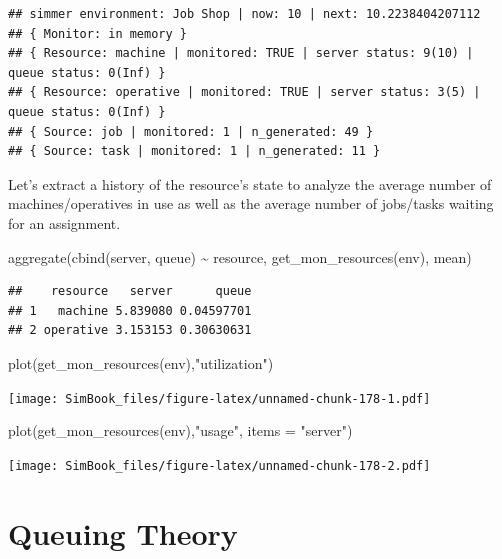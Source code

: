 \documentclass[
]{book}
\newenvironment{Shaded}{\begin{snugshade}}{\end{snugshade}}
\newcommand{\AttributeTok}[1]{\textcolor[rgb]{0.77,0.63,0.00}{#1}}
\newcommand{\FunctionTok}[1]{\textcolor[rgb]{0.00,0.00,0.00}{#1}}
\newcommand{\NormalTok}[1]{#1}
\newcommand{\SpecialCharTok}[1]{\textcolor[rgb]{0.00,0.00,0.00}{#1}}
\newcommand{\StringTok}[1]{\textcolor[rgb]{0.31,0.60,0.02}{#1}}
\begin{document}
\begin{verbatim}
## simmer environment: Job Shop | now: 10 | next: 10.2238404207112
## { Monitor: in memory }
## { Resource: machine | monitored: TRUE | server status: 9(10) | queue status: 0(Inf) }
## { Resource: operative | monitored: TRUE | server status: 3(5) | queue status: 0(Inf) }
## { Source: job | monitored: 1 | n_generated: 49 }
## { Source: task | monitored: 1 | n_generated: 11 }
\end{verbatim}

Let's extract a history of the resource's state to analyze the average number of machines/operatives in use as well as the average number of jobs/tasks waiting for an assignment.

\begin{Shaded}
\begin{Highlighting}[]
\FunctionTok{aggregate}\NormalTok{(}\FunctionTok{cbind}\NormalTok{(server, queue) }\SpecialCharTok{\textasciitilde{}}\NormalTok{ resource, }\FunctionTok{get\_mon\_resources}\NormalTok{(env), mean)}
\end{Highlighting}
\end{Shaded}

\begin{verbatim}
##    resource   server      queue
## 1   machine 5.839080 0.04597701
## 2 operative 3.153153 0.30630631
\end{verbatim}

\begin{Shaded}
\begin{Highlighting}[]
\FunctionTok{plot}\NormalTok{(}\FunctionTok{get\_mon\_resources}\NormalTok{(env),}\StringTok{"utilization"}\NormalTok{)}
\end{Highlighting}
\end{Shaded}

\texttt{[image: SimBook\_files/figure-latex/unnamed-chunk-178-1.pdf]}

\begin{Shaded}
\begin{Highlighting}[]
\FunctionTok{plot}\NormalTok{(}\FunctionTok{get\_mon\_resources}\NormalTok{(env),}\StringTok{"usage"}\NormalTok{, }\AttributeTok{items =} \StringTok{"server"}\NormalTok{)}
\end{Highlighting}
\end{Shaded}

\texttt{[image: SimBook\_files/figure-latex/unnamed-chunk-178-2.pdf]}

\hypertarget{queuing-theory}{%
\chapter{Queuing Theory}\label{queuing-theory}}
\end{document}
